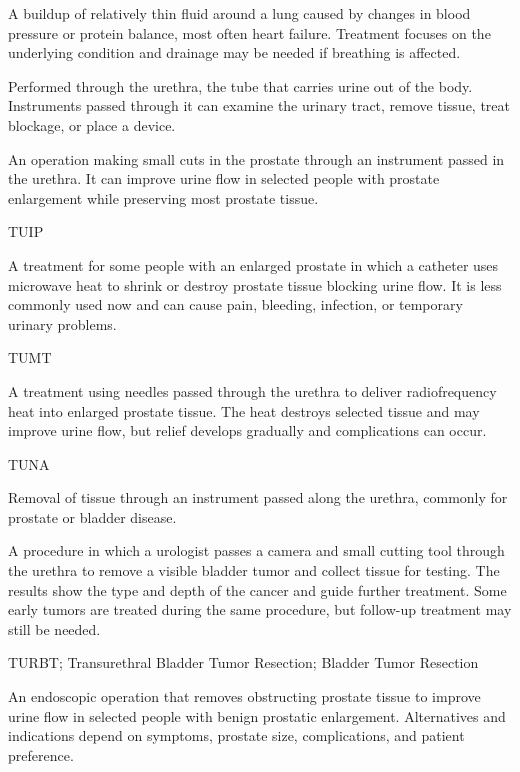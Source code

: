  A buildup of relatively thin fluid around a lung caused by changes in blood pressure or protein balance, most often heart failure. Treatment focuses on the underlying condition and drainage may be needed if breathing is affected.

 Performed through the urethra, the tube that carries urine out of the body. Instruments passed through it can examine the urinary tract, remove tissue, treat blockage, or place a device.

 An operation making small cuts in the prostate through an instrument passed in the urethra. It can improve urine flow in selected people with prostate enlargement while preserving most prostate tissue.

\synonyms
TUIP

 A treatment for some people with an enlarged prostate in which a catheter uses microwave heat to shrink or destroy prostate tissue blocking urine flow. It is less commonly used now and can cause pain, bleeding, infection, or temporary urinary problems.

\synonyms
TUMT

 A treatment using needles passed through the urethra to deliver radiofrequency heat into enlarged prostate tissue. The heat destroys selected tissue and may improve urine flow, but relief develops gradually and complications can occur.

\synonyms
TUNA

 Removal of tissue through an instrument passed along the urethra, commonly for prostate or bladder disease.

 A procedure in which a urologist passes a camera and small cutting tool through the urethra to remove a visible bladder tumor and collect tissue for testing. The results show the type and depth of the cancer and guide further treatment. Some early tumors are treated during the same procedure, but follow-up treatment may still be needed.

\synonyms
TURBT; Transurethral Bladder Tumor Resection; Bladder Tumor Resection

 An endoscopic operation that removes obstructing prostate tissue to
improve urine flow in selected people with benign prostatic enlargement. Alternatives and
indications depend on symptoms, prostate size, complications, and patient preference.

